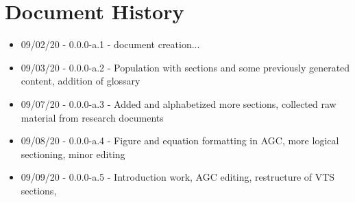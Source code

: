 \chapter{Document History}

\begin{itemize}
\itemsep 0em
\item 09/02/20 - 0.0.0-a.1 - document creation...
\item 09/03/20 - 0.0.0-a.2 - Population with sections and some previously generated content, addition of glossary
\item 09/07/20 - 0.0.0-a.3 - Added and alphabetized more sections, collected raw material from research documents
\item 09/08/20 - 0.0.0-a.4 - Figure and equation formatting in AGC, more logical sectioning, minor editing
\item 09/09/20 - 0.0.0-a.5 - Introduction work, AGC editing, restructure of VTS sections,
\end{itemize}